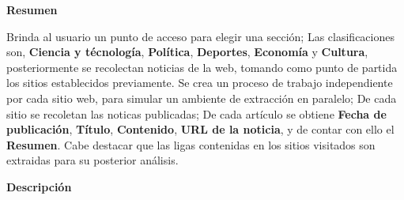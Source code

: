 
\begin{large}
	\textbf{Resumen}\\
\end{large}

Brinda al usuario un punto de acceso para elegir una sección; Las clasificaciones son, 
\textbf{Ciencia y técnología}, \textbf{Política}, \textbf{Deportes}, \textbf{Economía} y  
\textbf{Cultura}, posteriormente se recolectan noticias de la web, tomando como punto de 
partida los sitios establecidos previamente. Se crea un proceso de 
trabajo independiente por cada sitio web, para simular un ambiente de extracción 
en paralelo; De cada sitio se recoletan las noticas publicadas; De cada artículo se obtiene 
\textbf{Fecha de publicación}, \textbf{Título}, \textbf{Contenido}, \textbf{URL de la noticia}, 
y de contar con ello el \textbf{Resumen}. Cabe destacar que 
las ligas contenidas en los sitios visitados son extraidas para su posterior análisis.\\

\begin{large}
	\textbf{Descripción}\\
\end{large} 


